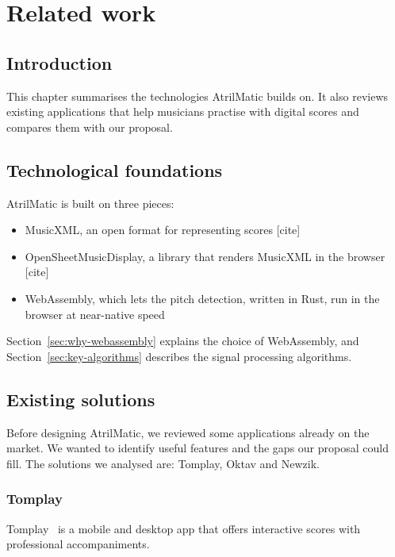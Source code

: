 \chapter{Related work}

\section{Introduction}

This chapter summarises the technologies AtrilMatic builds on. It also 
reviews existing applications that help musicians practise with digital 
scores and compares them with our proposal.

\section{Technological foundations}


AtrilMatic is built on three pieces:
\begin{itemize}
	\item MusicXML, an open format for representing scores [cite]
	\item OpenSheetMusicDisplay, a library that renders MusicXML in the browser [cite]
	\item WebAssembly, which lets the pitch detection, written in Rust, run in the browser at near-native speed
\end{itemize}

Section~\ref{sec:why-webassembly} explains the choice of WebAssembly, and 
Section~\ref{sec:key-algorithms} describes the signal processing algorithms.

\section{Existing solutions}

Before designing AtrilMatic, we reviewed some applications already on the market. 
We wanted to identify useful features and the gaps our proposal could fill.
 The solutions we analysed are: Tomplay, Oktav and Newzik.

\subsection{Tomplay}


Tomplay~\cite{tomplay} is a mobile and desktop app that offers interactive 
scores with professional accompaniments.

